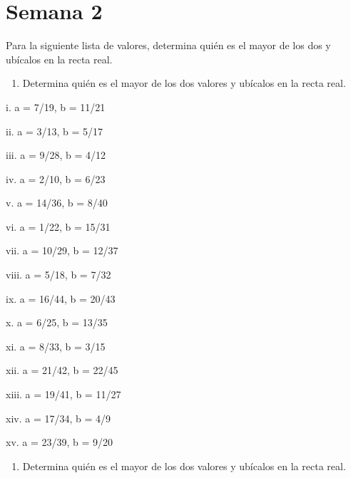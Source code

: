 \documentclass[]{book}
\providecommand{\tightlist}{%
  \setlength{\itemsep}{0pt}\setlength{\parskip}{0pt}}
\begin{document}
\section{Semana 2}\label{semana-2}

Para la siguiente lista de valores, determina quién es el mayor de los
dos y ubícalos en la recta real.

\begin{enumerate}
\def\labelenumi{\arabic{enumi}.}
\tightlist
\item
  Determina quién es el mayor de los dos valores y ubícalos en la recta
  real.
\end{enumerate}

\begin{multicols}{2}
  
    i. a = 7/19, b = 11/21
  
   ii. a = 3/13, b = 5/17
  
   iii. a = 9/28, b = 4/12
  
   iv. a = 2/10, b = 6/23
  
   v. a = 14/36, b = 8/40
  
   vi. a = 1/22, b = 15/31
  
   vii. a = 10/29, b = 12/37
  
   viii. a = 5/18, b = 7/32
  
   ix. a = 16/44, b = 20/43
  
   x. a = 6/25, b = 13/35
  
   xi. a = 8/33, b = 3/15
  
   xii. a = 21/42, b = 22/45
  
   xiii. a = 19/41, b = 11/27
  
   xiv. a = 17/34, b = 4/9
  
   xv. a = 23/39, b = 9/20
\end{multicols}

\begin{enumerate}
\def\labelenumi{\arabic{enumi}.}
\setcounter{enumi}{1}
\tightlist
\item
  Determina quién es el mayor de los dos valores y ubícalos en la recta
  real.
\end{enumerate}
\end{document}
